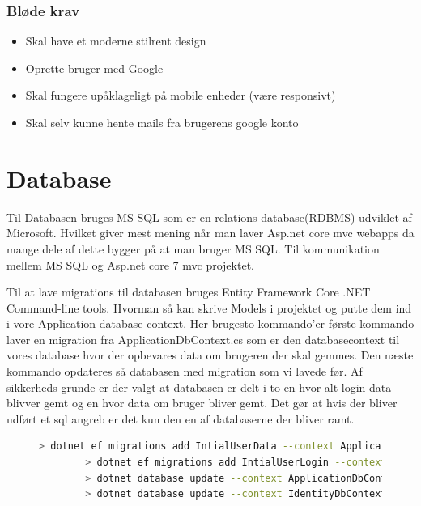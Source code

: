 \subsubsection{Bløde krav}
\begin{itemize}
    \item Skal have et moderne stilrent design
    \item Oprette bruger med Google
    \item Skal fungere upåklageligt på mobile enheder (være responsivt)
    \item Skal selv kunne hente mails fra brugerens google konto
\end{itemize}

\section{Database}
Til Databasen bruges MS SQL som er en relations database(RDBMS) udviklet af Microsoft. Hvilket
giver mest mening når man laver Asp.net core mvc webapps da mange dele af dette bygger på at man bruger
MS SQL. Til kommunikation mellem MS SQL og Asp.net core 7 mvc projektet.    

Til at lave migrations til databasen bruges Entity Framework Core .NET Command-line tools. 
Hvorman så kan skrive Models i projektet og putte dem ind i vore Application database 
context. Her brugesto kommando'er første kommando laver en migration fra ApplicationDbContext.cs 
som er den databasecontext til vores database hvor der opbevares data om brugeren der skal gemmes. 
Den næste kommando opdateres så databasen med migration som vi lavede før. Af sikkerheds grunde er der 
valgt at databasen er delt i to en hvor alt login data blivver gemt og en hvor data om bruger bliver gemt.
Det gør at hvis der bliver udført et sql angreb er det kun den en af databaserne der bliver ramt.

\begin{figure}[!h]
    \begin{lstlisting}[language=bash]
        > dotnet ef migrations add IntialUserData --context ApplicationDbContext
        > dotnet ef migrations add IntialUserLogin --context IdentityDbContext
        > dotnet database update --context ApplicationDbContext
        > dotnet database update --context IdentityDbContext
    \end{lstlisting}
\end{figure}

